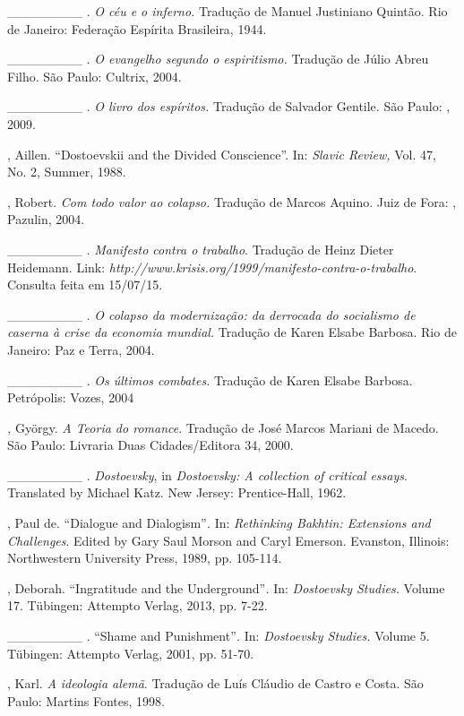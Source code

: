 \begin{Parskip}
\_\_\_\_\_\_\_\_ . \emph{O céu e o inferno.} Tradução de Manuel
Justiniano Quintão. Rio de Janeiro: Federação Espírita Brasileira, 1944.

\_\_\_\_\_\_\_\_ . \emph{O evangelho segundo o espiritismo.} Tradução de
Júlio Abreu Filho. São Paulo: Cultrix, 2004.

\_\_\_\_\_\_\_\_ . \emph{O livro dos espíritos.} Tradução de Salvador
Gentile. São Paulo: , 2009.

, Aillen. ``Dostoevskii and the Divided Conscience''. In:
\emph{Slavic Review,} Vol. 47, No. 2, Summer, 1988.

, Robert. \emph{Com todo valor ao colapso.} Tradução de Marcos
Aquino. Juiz de Fora: , Pazulin, 2004.

\_\_\_\_\_\_\_\_ . \emph{Manifesto contra o trabalho}. Tradução de Heinz
Dieter Heidemann. Link:
\emph{http://www.krisis.org/1999/manifesto-contra-o-trabalho}.
Consulta feita em 15/07/15.

\_\_\_\_\_\_\_\_ . \emph{O colapso da modernização: da derrocada do
socialismo de caserna à crise da economia mundial.} Tradução de Karen
Elsabe Barbosa. Rio de Janeiro: Paz e Terra, 2004.

\_\_\_\_\_\_\_\_ . \emph{Os últimos combates.} Tradução de Karen Elsabe
Barbosa. Petrópolis: Vozes, 2004

\emph{,} György. \emph{A Teoria do romance}. Tradução de José
Marcos Mariani de Macedo. São Paulo: Livraria Duas Cidades/Editora 34,
2000.

\_\_\_\_\_\_\_\_ . \emph{Dostoevsky}, in \emph{Dostoevsky: A collection
of critical essays}. Translated by Michael Katz. New Jersey:
Prentice-Hall, 1962.

, Paul de. ``Dialogue and Dialogism''\emph{.} In: \emph{Rethinking
Bakhtin: Extensions and Challenges}. Edited by Gary Saul Morson and
Caryl Emerson. Evanston, Illinois: Northwestern University Press, 1989,
pp. 105-114.

, Deborah. ``Ingratitude and the Underground''\emph{.} In:
\emph{Dostoevsky Studies.} Volume 17. Tübingen: Attempto Verlag, 2013,
pp. 7-22.

\_\_\_\_\_\_\_\_ . ``Shame and Punishment''\emph{.} In: \emph{Dostoevsky
Studies.} Volume 5. Tübingen: Attempto Verlag, 2001, pp. 51-70.

, Karl. \emph{A ideologia alemã}. Tradução de Luís Cláudio de Castro
e Costa. São Paulo: Martins Fontes, 1998.


\end{Parskip}
